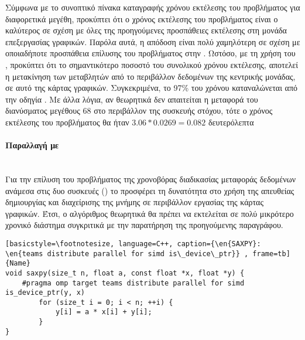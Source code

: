 Σύμφωνα με το συνοπτικό πίνακα καταγραφής χρόνου εκτέλεσης του προβλήματος για διαφορετικά μεγέθη, προκύπτει ότι ο χρόνος εκτέλεσης του προβλήματος είναι ο καλύτερος σε σχέση με όλες της προηγούμενες προσπάθειες εκτέλεσης στη μονάδα επεξεργασίας γραφικών. Παρόλα αυτά, η απόδοση είναι πολύ χαμηλότερη σε σχέση με οποιαδήποτε προσπάθεια επίλυσης του προβλήματος στην . Ωστόσο, με τη χρήση του , προκύπτει ότι το σημαντικότερο ποσοστό του συνολικού χρόνου εκτέλεσης, αποτελεί η μετακίνηση των μεταβλητών από το περιβάλλον δεδομένων της κεντρικής μονάδας, σε αυτό της κάρτας γραφικών. Συγκεκριμένα, το 97\% του χρόνου καταναλώνεται από την οδηγία \emph{}. Με άλλα λόγια, αν θεωρητικά δεν απαιτείται η μεταφορά του διανύσματος μεγέθους 68 στο περιβάλλον της συσκευής στόχου, τότε ο χρόνος εκτέλεσης του προβλήματος θα ήταν \textbf{$3.06 * 0.0269 = 0.082$} δευτερόλεπτα

\clearpage
\paragraph{Παραλλαγή με \emph{}}
\ \\
Για την επίλυση του προβλήματος της χρονοβόρας διαδικασίας μεταφοράς δεδομένων ανάμεσα στις δυο συσκευές () το  προσφέρει τη δυνατότητα στο χρήση της απευθείας δημιουργίας και διαχείρισης της μνήμης σε περιβάλλον εργασίας της κάρτας γραφικών. Έτσι, ο αλγόριθμος θεωρητικά θα πρέπει να εκτελείται σε πολύ μικρότερο χρονικό διάστημα συγκριτικά με την παρατήρηση της προηγούμενης παραγράφου.

\begin{spacing}{0.9}
\begin{lstlisting}[basicstyle=\footnotesize, language=C++, caption={\en{SAXPY}: \en{teams distribute parallel for simd is\_device\_ptr}} , frame=tb]{Name}
void saxpy(size_t n, float a, const float *x, float *y) {
    #pragma omp target teams distribute parallel for simd is_device_ptr(y, x)
        for (size_t i = 0; i < n; ++i) {
            y[i] = a * x[i] + y[i];
        }
}
\end{lstlisting}
\end{spacing}


